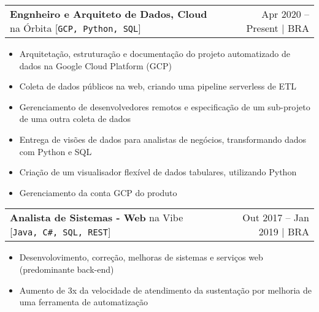 \documentclass[a4paper,11pt]{article}
\makeatletter
\newcommand{\udensdot}[1]{%
    \tikz[baseline=(todotted.base)]{
        \node[inner sep=0.5pt,outer sep=0.5pt] (todotted) {#1};
        \draw[densely dotted] (todotted.south west) -- (todotted.south east);
    }%
}%
\newcommand{\myHref}[2]{\udensdot{\hspace{-1.2pt}\href{#1}{#2}\hspace{-4pt}}\hspace{-1.2pt}}
\newcommand{\myHrefIcn}[2]{#2 \href{#1}{\scriptsize{\faExternalLink{}}}}
\newcommand{\resumeItemCustom}[1]{
  \item\small{#1 \vspace{-2pt}}
}
\newcommand{\resumeJobSubheadingD}[7]{
  \vspace{0pt}\item
    \begin{tabular*}{0.97\textwidth}{l@{\extracolsep{\fill}}r}
      \textbf{#4} na \myHrefIcn{#1}{#2} \hspace{3pt} [\small \texttt{#6}] & {\small #5}
    \end{tabular*}\vspace{-6pt}
}
\newcommand{\resumeItemListStart}{\begin{itemize}}
\newcommand{\resumeItemListEnd}{\end{itemize}\vspace{-5pt}}
\newcommand{\csharp}{C\#}
\makeatother
\begin{document}
    \resumeJobSubheadingD
      {http://orbita.srv.br/}{Órbita}{}%
      {Engnheiro e Arquiteto de Dados, Cloud}{Apr 2020 -- Present $\vert$ BRA}
      {GCP, Python, SQL}%
      {Data platform creation, automated data integration}
      \resumeItemListStart
        \resumeItemCustom{Arquitetação, estruturação e documentação do projeto automatizado de dados na Google Cloud Platform (GCP)}
        \resumeItemCustom{Coleta de dados públicos na web, criando uma pipeline serverless de ETL}
        \resumeItemCustom{Gerenciamento de desenvolvedores remotos e especificação de um sub-projeto de uma outra coleta de dados}
        \resumeItemCustom{Entrega de visões de dados para analistas de negócios, transformando dados com Python e SQL}
        \resumeItemCustom{Criação de um visualisador flexível de dados tabulares, utilizando Python}
        \resumeItemCustom{Gerenciamento da conta GCP do produto}
      \resumeItemListEnd
    
    \resumeJobSubheadingD
      {http://www.vibetecnologia.com/}{Vibe}{Tecnologia para negócios}%
      {Analista de Sistemas - Web}{Out 2017 -- Jan 2019 $\vert$ BRA}
      {Java, \csharp, SQL, REST}%
      {Aplicativos web de Internet Banking, sistemas de gerenciamento, serviços web para o banco \myHref{http://www.banpara.b.br/}{Banpará}}
      \resumeItemListStart
        \resumeItemCustom{Desenvolovimento, correção, melhoras de sistemas e serviços web (predominante back-end)}
        \resumeItemCustom{Aumento de 3x da velocidade de atendimento da sustentação por melhoria de uma ferramenta de automatização}
      \resumeItemListEnd
\end{document}
